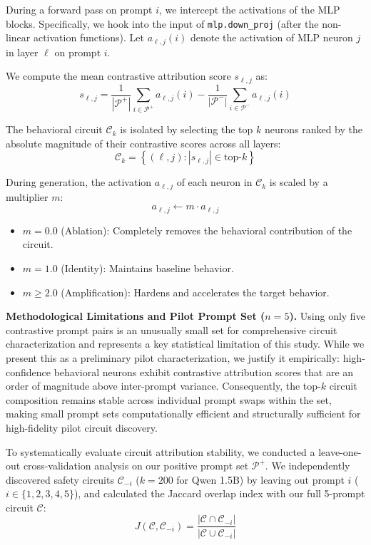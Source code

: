 \documentclass[11pt]{article}
\begin{document}
During a forward pass on prompt $i$, we intercept the activations of the MLP blocks. Specifically, we hook into the input of \texttt{mlp.down\_proj} (after the non-linear activation functions). Let $a_{\ell,j}(i)$ denote the activation of MLP neuron $j$ in layer $\ell$ on prompt $i$. 

We compute the mean contrastive attribution score $s_{\ell,j}$ as:
\begin{equation}
s_{\ell,j} = \frac{1}{|\mathcal{P}^+|}\sum_{i \in \mathcal{P}^+} a_{\ell,j}(i) - \frac{1}{|\mathcal{P}^-|}\sum_{i \in \mathcal{P}^-} a_{\ell,j}(i)
\end{equation}

The behavioral circuit $\mathcal{C}_k$ is isolated by selecting the top $k$ neurons ranked by the absolute magnitude of their contrastive scores across all layers:
\begin{equation}
\mathcal{C}_k = \left\{ (\ell, j) : |s_{\ell,j}| \in \text{top-}k \right\}
\end{equation}

During generation, the activation $a_{\ell,j}$ of each neuron in $\mathcal{C}_k$ is scaled by a multiplier $m$:
\begin{equation}
a_{\ell,j} \leftarrow m \cdot a_{\ell,j}
\end{equation}
\begin{itemize}
    \item $m=0.0$ (Ablation): Completely removes the behavioral contribution of the circuit.
    \item $m=1.0$ (Identity): Maintains baseline behavior.
    \item $m \ge 2.0$ (Amplification): Hardens and accelerates the target behavior.
\end{itemize}

\textbf{Methodological Limitations and Pilot Prompt Set ($n=5$).} Using only five contrastive prompt pairs is an unusually small set for comprehensive circuit characterization and represents a key statistical limitation of this study. While we present this as a preliminary pilot characterization, we justify it empirically: high-confidence behavioral neurons exhibit contrastive attribution scores that are an order of magnitude above inter-prompt variance. Consequently, the top-$k$ circuit composition remains stable across individual prompt swaps within the set, making small prompt sets computationally efficient and structurally sufficient for high-fidelity pilot circuit discovery. 

To systematically evaluate circuit attribution stability, we conducted a leave-one-out cross-validation analysis on our positive prompt set $\mathcal{P}^+$. We independently discovered safety circuits $\mathcal{C}_{-i}$ ($k=200$ for Qwen 1.5B) by leaving out prompt $i$ ($i \in \{1, 2, 3, 4, 5\}$), and calculated the Jaccard overlap index with our full 5-prompt circuit $\mathcal{C}$:
\begin{equation}
J(\mathcal{C}, \mathcal{C}_{-i}) = \frac{|\mathcal{C} \cap \mathcal{C}_{-i}|}{|\mathcal{C} \cup \mathcal{C}_{-i}|}
\end{equation}
\end{document}
